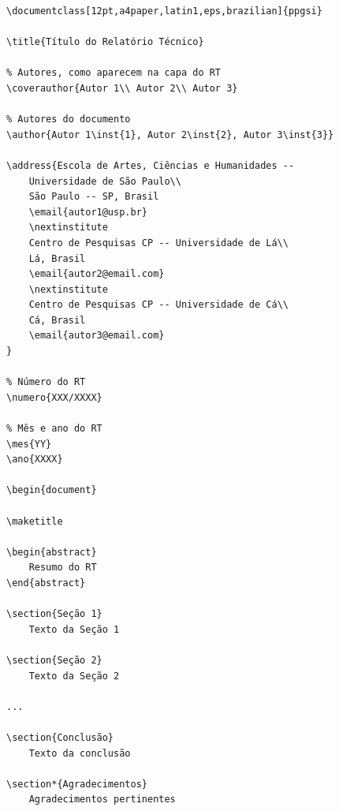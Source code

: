 \documentclass[12pt,a4paper,utf8]{ppgsi}
\begin{document}
\begin{verbatim}
\documentclass[12pt,a4paper,latin1,eps,brazilian]{ppgsi}

\title{Título do Relatório Técnico}

% Autores, como aparecem na capa do RT
\coverauthor{Autor 1\\ Autor 2\\ Autor 3}

% Autores do documento
\author{Autor 1\inst{1}, Autor 2\inst{2}, Autor 3\inst{3}}

\address{Escola de Artes, Ciências e Humanidades --
    Universidade de São Paulo\\
    São Paulo -- SP, Brasil
    \email{autor1@usp.br}
    \nextinstitute
    Centro de Pesquisas CP -- Universidade de Lá\\
    Lá, Brasil
    \email{autor2@email.com}
    \nextinstitute
    Centro de Pesquisas CP -- Universidade de Cá\\
    Cá, Brasil
    \email{autor3@email.com}
}

% Número do RT
\numero{XXX/XXXX}

% Mês e ano do RT
\mes{YY}
\ano{XXXX}

\begin{document}

\maketitle

\begin{abstract}
    Resumo do RT
\end{abstract}

\section{Seção 1}
    Texto da Seção 1

\section{Seção 2}
    Texto da Seção 2

...

\section{Conclusão}
    Texto da conclusão

\section*{Agradecimentos}
    Agradecimentos pertinentes


\end{verbatim}
\end{document}

